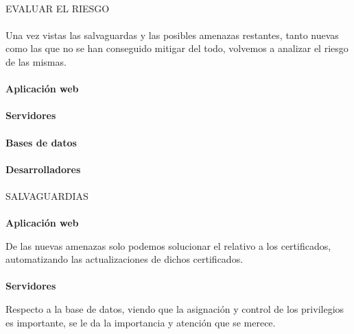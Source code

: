 \paragraph{}
EVALUAR EL RIESGO
\paragraph{}
Una vez vistas las salvaguardas y las posibles amenazas restantes, tanto nuevas como las que no se han conseguido mitigar del todo, volvemos a analizar el riesgo de las mismas.


\paragraph{}
\textbf{Aplicación web}

\paragraph{}
\textbf{Servidores}

\paragraph{}
\textbf{Bases de datos}

\paragraph{}
\textbf{Desarrolladores}

\paragraph{}
SALVAGUARDIAS

\paragraph{}
\textbf{Aplicación web}

De las nuevas amenazas solo podemos solucionar el relativo a los certificados, automatizando las actualizaciones de dichos certificados.
\paragraph{}
\textbf{Servidores}

Respecto a la base de datos, viendo que la asignación y control de los privilegios es importante, se le da la importancia y atención que se merece.


